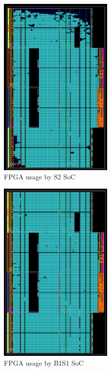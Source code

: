 \begin{figure}[H]
    \centering
    \includegraphics[width=0.5\textwidth]{img/s2_fpga_impl.png}
    \caption{FPGA usage by S2 SoC}
    \label{fig:s2_fpga}
\end{figure}

\begin{figure}[H]
    \centering
    \includegraphics[width=0.5\textwidth]{img/b1s1_fpga_impl.png}
    \caption{FPGA usage by B1S1 SoC}
    \label{fig:b1s1_fpga}
\end{figure}

